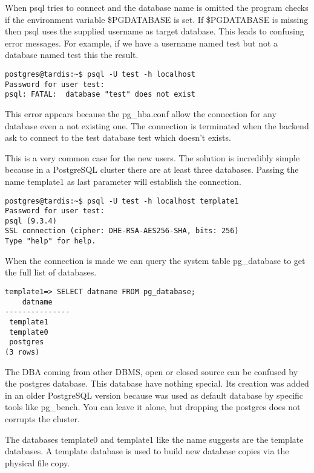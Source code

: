 When psql tries to connect and the database name is omitted the program checks if the environment
variable \$PGDATABASE  is set. If \$PGDATABASE is missing then psql
uses the supplied username  as target database. This leads to confusing error messages. For
example, if we have a username named test but not a database named test this the result.

\begin{verbatim}
postgres@tardis:~$ psql -U test -h localhost
Password for user test: 
psql: FATAL:  database "test" does not exist
\end{verbatim}

This error appears because the pg\_hba.conf allow the connection for any database even a not
existing one. The connection is terminated when the backend ask to connect to the test database
test which doesn't exists.\newline

This is a very common case for the new users. The solution is incredibly simple because in a
PostgreSQL cluster there are at least three databases. Passing the name template1 as last parameter
will establish the connection.

\begin{verbatim}
postgres@tardis:~$ psql -U test -h localhost template1
Password for user test: 
psql (9.3.4)
SSL connection (cipher: DHE-RSA-AES256-SHA, bits: 256)
Type "help" for help.
\end{verbatim}

When the connection is made we can query the system table pg\_database to get the full list of
databases.

\begin{lstlisting}[style=pgsql]
template1=> SELECT datname FROM pg_database;
    datname    
---------------
 template1
 template0
 postgres
(3 rows)

\end{lstlisting}

The DBA coming from other DBMS, open or closed source can be confused by the postgres database.
This database have nothing special. Its creation was added in an older PostgreSQL version because
was used as default database by specific tools like pg\_bench. You can leave it alone, but dropping
the postgres does not corrupts the cluster.\newline

The databases template0 and template1   like the name suggests are the template databases. A template database  is used to build new database copies via the physical file copy. 

